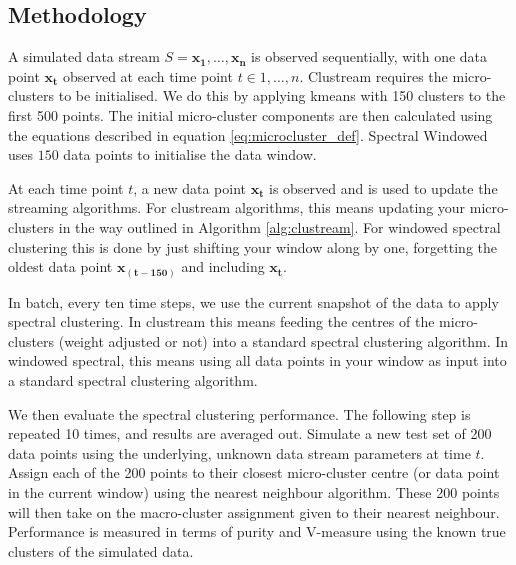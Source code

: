 
\subsection{Methodology}
\label{sec:methodology}

A simulated data stream $S = {\boldsymbol{x_1},\ldots, \boldsymbol{x_n}  }$ is observed sequentially, with one data point $\boldsymbol{x_t}$ observed at each time point $t \in 1, \ldots, n$. Clustream requires the micro-clusters to be initialised. We do this by applying kmeans with 150 clusters to the first 500 points. The initial micro-cluster components are then calculated using the equations described in equation \eqref{eq:microcluster_def}. Spectral Windowed uses $150$ data points to initialise the data window.  

At each time point $t$, a new data point  $\boldsymbol{x_t}$ is observed and is used to update the streaming algorithms. For clustream algorithms, this means updating your micro-clusters in the way outlined in Algorithm \ref{alg:clustream}. For windowed spectral clustering this is done by just shifting your window along by one, forgetting the oldest data point $\boldsymbol{x_{(t-150)}}$ and including $\boldsymbol{x_t}$. 

In batch, every ten time steps, we use the current snapshot of the data to apply spectral clustering. In clustream this means feeding the centres of the micro-clusters (weight adjusted or not) into a standard spectral clustering algorithm. In windowed spectral, this means using all data points in your window  as input into a standard spectral clustering algorithm. 

We then evaluate the spectral clustering performance. The following step is repeated 10 times, and results are averaged out. Simulate a new test set of 200 data points using the underlying, unknown data stream parameters at time $t$. Assign each of the 200 points to their closest micro-cluster centre (or data point in the current window) using the nearest neighbour algorithm. These 200 points will then take on the macro-cluster assignment given to their nearest neighbour. Performance is measured in terms of purity and V-measure using the known true clusters of the simulated data.

